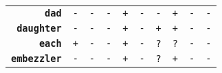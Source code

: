 \documentclass{article}
\begin{document}
\begin{minipage}{\textwidth}
{\begin{tabular}{|r|c|c|c|c|c|c|c|c|c|}
    \textbf{\texttt{dad}} & \texttt{-}
    & \texttt{-} & \texttt{-}
    & \texttt{+} & \texttt{-}
    & \texttt{-} & \texttt{+}
    & \texttt{-} & \texttt{-} \\
    \textbf{\texttt{daughter}} & \texttt{-}
    & \texttt{-} & \texttt{-}
    & \texttt{+} & \texttt{-}
    & \texttt{+} & \texttt{+}
    & \texttt{-} & \texttt{-} \\
    \textbf{\texttt{each}} & \texttt{+}
    & \texttt{-} & \texttt{-}
    & \texttt{+} & \texttt{-}
    & \texttt{?} & \texttt{?}
    & \texttt{-} & \texttt{-} \\
    \textbf{\texttt{embezzler}} & \texttt{-}
    & \texttt{-} & \texttt{-}
    & \texttt{+} & \texttt{-}
    & \texttt{?} & \texttt{+}
    & \texttt{-} & \texttt{-} \\
    \hline
  \end{tabular}
  }
\end{minipage}
\bigbreak
\bigbreak
\bigbreak
\end{document}
